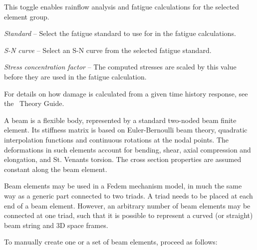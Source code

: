 \begin{bulletlist}
\item This toggle enables rainflow analysis and fatigue calculations
  for the selected element group.
\item{\sl Standard} --
  Select the fatigue standard to use for in the fatigue calculations.
\item{\sl S-N curve} --
  Select an S-N curve from the selected fatigue standard.
\item{\sl Stress concentration factor} --
  The computed stresses are scaled by this value before they are used in
  the fatigue calculation.
\end{bulletlist}


For details on how damage is calculated from a given time history response,
see the \FedemVer~Theory Guide.

\clearpage



A beam is a flexible body, represented by a standard two-noded beam
finite element. Its stiffness matrix is based on Euler-Bernoulli beam
theory, quadratic interpolation functions and continuous rotations at
the nodal points. The deformations in such elements account for bending,
shear, axial compression and elongation, and St. Venants torsion. The
cross section properties are assumed constant along the beam element.

Beam elements may be used in a Fedem mechanism model, in much the same
way as a generic part connected to two triads. A triad needs to be
placed at each end of a beam element. However, an arbitrary number of
beam elements may be connected at one triad, such that it is possible to
represent a curved (or straight) beam string and 3D space frames.



To manually create one or a set of beam elements, proceed as follows:

\vskip20mm


